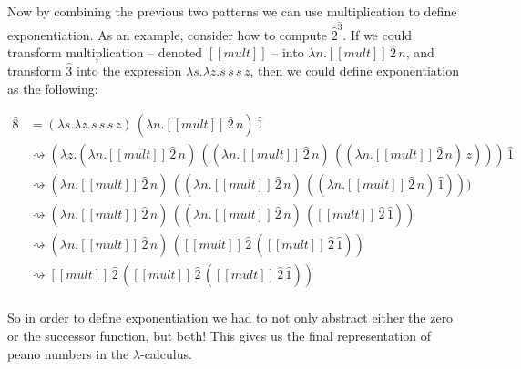 \documentclass{article}
\newcommand {\redto}[0]{\rightsquigarrow}
\begin{document}
Now by combining the previous two patterns we can use multiplication
to define exponentiation.  As an example, consider how to compute
$\hat{2}^{\hat{3}}$.  If we could transform multiplication -- denoted
$[[mult]]$ -- into $\lambda n.[[mult]]\,\hat{2}\,n$, and transform $\hat{3}$
into the expression $\lambda s.\lambda z.s\,s\,s\,z$, then we could define
exponentiation as the following:
\begin{center}
  \begin{math}
    \begin{array}{lll}
      \hat{8}
      & = (\lambda s.\lambda z.s\,s\,s\,z)\,(\lambda n.[[mult]]\,\hat{2}\,n)\,\hat{1} \\
      & \redto (\lambda z.(\lambda n.[[mult]]\,\hat{2}\,n)\,((\lambda n.[[mult]]\,\hat{2}\,n)\,((\lambda n.[[mult]]\,\hat{2}\,n)\,z)))\,\hat{1}\\
      & \redto (\lambda n.[[mult]]\,\hat{2}\,n)\,((\lambda n.[[mult]]\,\hat{2}\,n)\,((\lambda n.[[mult]]\,\hat{2}\,n)\,\hat{1})))\\
      & \redto (\lambda n.[[mult]]\,\hat{2}\,n)\,((\lambda n.[[mult]]\,\hat{2}\,n)\,([[mult]]\,\hat{2}\,\hat{1}))\\
      & \redto (\lambda n.[[mult]]\,\hat{2}\,n)\,([[mult]]\,\hat{2}\,([[mult]]\,\hat{2}\,\hat{1}))\\
      & \redto [[mult]]\,\hat{2}\,([[mult]]\,\hat{2}\,([[mult]]\,\hat{2}\,\hat{1}))\\
    \end{array}
  \end{math}
\end{center}
So in order to define exponentiation we had to not only abstract
either the zero or the successor function, but both!  This gives us
the final representation of peano numbers in the $\lambda$-calculus.
\end{document}

